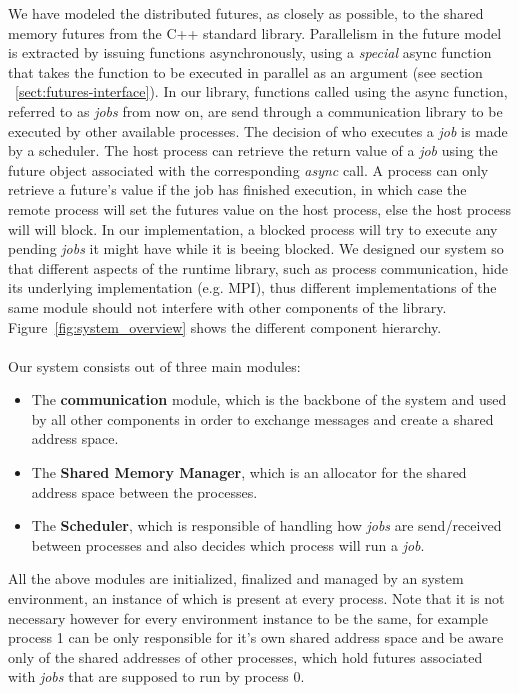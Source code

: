 We have modeled the distributed futures, as closely as possible, 
to the shared memory futures from the C++ standard library.  Parallelism in the future
model is extracted by issuing functions asynchronously, using a \emph{special} async function
that takes the function to be executed in parallel as an argument (see section ~\ref{sect:futures-interface}).
In our library, functions called using the async function,
referred to as \emph{jobs} from now on, are send through a communication library 
to be executed by other available processes.  
The decision of who executes a \emph{job} is made by a scheduler.  The host process can retrieve
the return value of a \emph{job} using the future object associated with the corresponding \emph{async} call.
A process can only retrieve a future's value if the job has finished execution, in which case the remote 
process will set the futures value on the host process, else the host process will will block.
In our implementation, a blocked process will try to execute any pending \emph{jobs} it might have
while it is beeing blocked.
		We designed our system so that different aspects of the runtime library, such as process
communication, hide its underlying implementation (e.g. MPI),  thus different implementations 
of the same module should not interfere with other components of the library.
Figure~\ref{fig:system_overview} shows the different component hierarchy.\\
\\
Our system consists out of three main modules:
\begin{itemize}
	\item The \textbf{communication} module, which is the backbone of the system
	and used by all other components in order to exchange messages and create a shared address space.

	\item The \textbf{Shared Memory Manager}, which is an allocator for the shared address space between the processes.

	\item The \textbf{Scheduler}, which is responsible of handling how \emph{jobs} are send/received between processes
	and also decides which process will run a \emph{job}.
\end{itemize}

\vfill

All the above modules are initialized, finalized and managed by an system environment, 
an instance of which is present
at every process.  Note that it is not necessary however for every environment instance to be the same, for
example process 1 can be only responsible for it's own shared address space and be aware only of the shared
addresses of other processes, which hold futures associated with \emph{jobs} that are supposed to run by
process 0.

